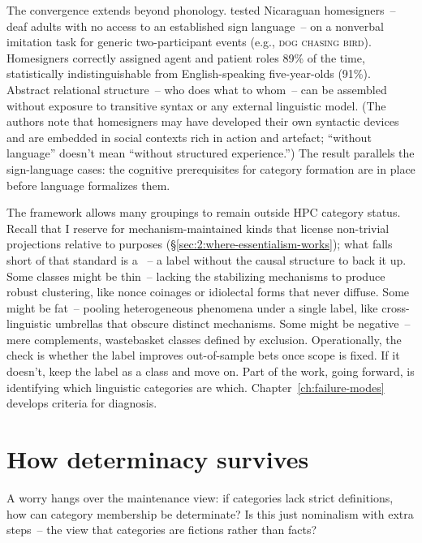 The convergence extends beyond phonology. \textcite{canudas-grabolosa2026linguisticModel} tested Nicaraguan homesigners~-- deaf adults with no access to an established sign language~-- on a nonverbal imitation task for generic two-participant events (e.g., \textsc{dog chasing bird}). Homesigners correctly assigned agent and patient roles 89\% of the time, statistically indistinguishable from English-speaking five-year-olds (91\%). Abstract relational structure~-- who does what to whom~-- can be assembled without exposure to transitive syntax or any external linguistic model. (The authors note that homesigners may have developed their own syntactic devices and are embedded in social contexts rich in action and artefact; \enquote{without language} doesn't mean \enquote{without structured experience.}) The result parallels the sign-language cases: the cognitive prerequisites for category formation are in place before language formalizes them.


The framework allows many groupings to remain outside HPC category status. Recall that I reserve  for mechanism-maintained kinds that license non-trivial projections relative to purposes (§\ref{sec:2:where-essentialism-works}); what falls short of that standard is a ~-- a label without the causal structure to back it up. Some classes might be thin~-- lacking the stabilizing mechanisms to produce robust clustering, like nonce coinages or idiolectal forms that never diffuse. Some might be fat~-- pooling heterogeneous phenomena under a single label, like cross-linguistic umbrellas that obscure distinct mechanisms. Some might be negative~-- mere complements, wastebasket classes defined by exclusion. Operationally, the check is whether the label improves out-of-sample bets once scope is fixed. If it doesn't, keep the label as a class and move on. Part of the work, going forward, is identifying which linguistic categories are which. Chapter~\ref{ch:failure-modes} develops criteria for diagnosis.


\section{How determinacy survives}
\label{sec:4:determinacy}

A worry hangs over the maintenance view: if categories lack strict definitions, how can category membership be determinate? Is this just nominalism with extra steps~-- the view that categories are fictions rather than facts?

